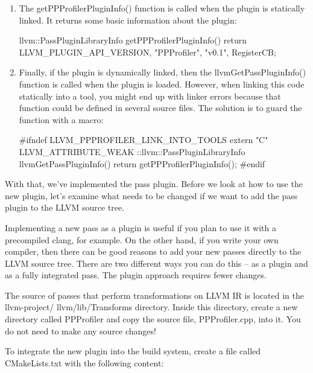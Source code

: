 \begin{enumerate}
\item
The getPPProfilerPluginInfo() function is called when the plugin is statically linked.
It returns some basic information about the plugin:

\begin{cpp}
llvm::PassPluginLibraryInfo getPPProfilerPluginInfo() {
    return {LLVM_PLUGIN_API_VERSION, "PPProfiler", "v0.1",
        RegisterCB};
}
\end{cpp}

\item
Finally, if the plugin is dynamically linked, then the llvmGetPassPluginInfo() function is called when the plugin is loaded. However, when linking this code statically into a tool, you might end up with linker errors because that function could be defined in several source files.
The solution is to guard the function with a macro:

\begin{cpp}
#ifndef LLVM_PPPROFILER_LINK_INTO_TOOLS
extern "C" LLVM_ATTRIBUTE_WEAK ::llvm::PassPluginLibraryInfo
llvmGetPassPluginInfo() {
    return getPPProfilerPluginInfo();
}
#endif
\end{cpp}

\end{enumerate}

With that, we’ve implemented the pass plugin. Before we look at how to use the new plugin, let’s examine what needs to be changed if we want to add the pass plugin to the LLVM source tree.


Implementing a new pass as a plugin is useful if you plan to use it with a precompiled clang, for example. On the other hand, if you write your own compiler, then there can be good reasons to add your new passes directly to the LLVM source tree. There are two different ways you can do this – as a plugin and as a fully integrated pass. The plugin approach requires fewer changes.


The source of passes that perform transformations on LLVM IR is located in the llvm-project/ llvm/lib/Transforms directory. Inside this directory, create a new directory called PPProfiler and copy the source file, PPProfiler.cpp, into it. You do not need to make any source changes!

To integrate the new plugin into the build system, create a file called CMakeLists.txt with the following content:

